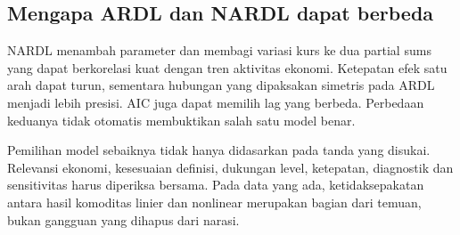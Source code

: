 \subsection{Mengapa ARDL dan NARDL dapat berbeda}
NARDL menambah parameter dan membagi variasi kurs ke dua partial sums yang dapat berkorelasi kuat dengan tren aktivitas ekonomi. Ketepatan efek satu arah dapat turun, sementara hubungan yang dipaksakan simetris pada ARDL menjadi lebih presisi. AIC juga dapat memilih lag yang berbeda. Perbedaan keduanya tidak otomatis membuktikan salah satu model benar.

Pemilihan model sebaiknya tidak hanya didasarkan pada tanda yang disukai. Relevansi ekonomi, kesesuaian definisi, dukungan level, ketepatan, diagnostik dan sensitivitas harus diperiksa bersama. Pada data yang ada, ketidaksepakatan antara hasil komoditas linier dan nonlinear merupakan bagian dari temuan, bukan gangguan yang dihapus dari narasi.
